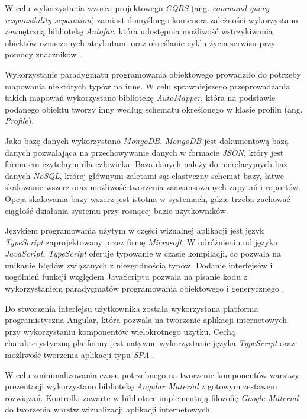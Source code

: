 \documentclass[a4paper,twoside,12pt]{book}
\newcommand{\obcy}[1]{\emph{#1}}
\newcommand{\ang}[1]{{\selectlanguage{british}\obcy{#1}}}
\begin{document}
{	W celu wykorzystania wzorca projektowego \textit{CQRS} (ang. \ang{command query responsibility separation}) zamiast domyślnego kontenera zależności wykorzystano zewnętrzną bibliotekę \textit{Autofac}, która udostępnia możliwość wstrzykiwania obiektów oznaczonych atrybutami oraz określanie cyklu życia serwisu przy pomocy znaczników \cite{bib:autofactag}.
	
	Wykorzystanie paradygmatu programowania obiektowego prowadziło do potrzeby mapowania niektórych typów na inne. W celu sprawniejszego przeprowadzania takich mapowań wykorzystano bibliotekę \textit{AutoMapper}, która na podstawie podanego obiektu tworzy inny według schematu określonego w klasie profilu (ang. \ang{Profile}).
	
	Jako bazę danych wykorzystano \textit{MongoDB}. \textit{MongoDB} jest dokumentową bazą danych pozwalająca na przechowywanie danych w formacie \textit{JSON}, który jest formatem czytelnym dla człowieka. Baza danych należy do nierelacyjnych baz danych \textit{NoSQL}, której głównymi zaletami są: elastyczny schemat bazy, łatwe skalowanie wszerz oraz możliwość tworzenia zaawansowanych zapytań i raportów\cite {bib:mongodb_guide}. Opcja skalowania bazy wszerz jest istotna w systemach, gdzie trzeba zachować ciągłość działania systemu przy rosnącej bazie użytkowników.
	
	Językiem programowania użytym w części wizualnej aplikacji jest język \textit{TypeScript} zaprojektowany przez firmę \textit{Microsoft}. W odróżnieniu od języka \textit{JavaScript}, \textit{TypeScript} oferuje typowanie w czasie kompilacji, co pozwala na unikanie błędów związanych z niezgodnością typów. Dodanie interfejsów i uogólnień funkcji względem JavaScriptu pozwala na pisanie kodu z wykorzystaniem paradygmatów programowania obiektowego i generycznego \cite {bib:typescript}.
	
	Do stworzenia interfejsu użytkownika została wykorzystana platforma programistyczna Angular, która pozwala na tworzenie aplikacji internetowych przy wykorzystaniu komponentów wielokrotnego użytku. Cechą charakterystyczną platformy jest natywne wykorzystanie języka \textit{TypeScript} oraz możliwość tworzenia aplikacji typu \textit{SPA} \cite{bib:anuglar} \cite{bib:typescript}.
	
	W celu zminimalizowania czasu potrzebnego na tworzenie komponentów warstwy prezentacji wykorzystano bibliotekę \textit{Angular Material} z gotowym zestawem rozwiązań. Kontrolki zawarte w bibliotece implementują filozofię \textit{Google Material} do tworzenia warstw wizualizacji aplikacji internetowych.
	
}
\end{document}
